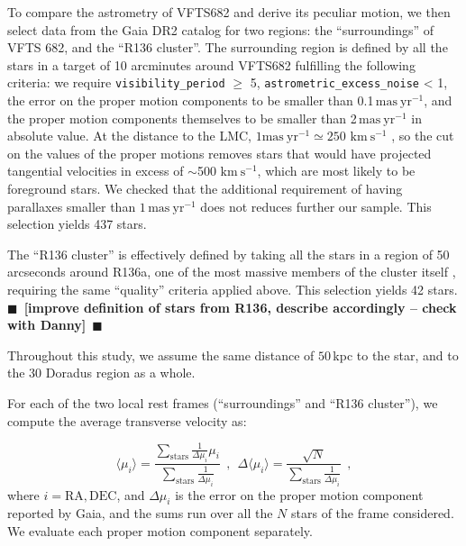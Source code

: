 \documentclass{aa}
\newcommand{\todo}[1]{{\large $\blacksquare$~\textbf{\color{red}[#1]}}~$\blacksquare$}
\newcommand{\kms}{{\,\mathrm{km\ s^{-1}}}}
\begin{document}
To compare the astrometry of VFTS682 and derive its peculiar motion,
we then select data from the Gaia DR2 catalog for two regions: the
``surroundings'' of VFTS 682, and the ``R136 cluster''. The
surrounding region is defined by all the stars in a target of 10 arcminutes around
VFTS682 fulfilling the following criteria: we require \texttt{visibility\_period} $\geq$ 5,
\texttt{astrometric\_excess\_noise} < 1, the error on the proper
motion components to be smaller than 0.1\,$\mathrm{mas\ yr^{-1}}$,
and the proper motion components themselves to be smaller than
2\,$\mathrm{mas\ yr^{-1}}$ in absolute value. At the distance to the
LMC, $1\mathrm{mas\ yr^{-1}}\simeq250\,\kms$ \citep[e.g.,][]{lennon:18}, so the cut on the values
of the proper motions removes stars that would have projected
tangential velocities in excess of $\sim$500\,$\kms$, which are most
likely to be foreground stars. We checked that the additional
requirement of having parallaxes smaller than $1\,\mathrm{mas\
  yr^{-1}}$ does not reduces further our sample. This selection yields 437 stars.

The ``R136 cluster'' is effectively defined by taking all the stars
in a region of 50 arcseconds around R136a, one of the most massive members of
the cluster itself \citep[][]{crowther:10}, requiring the same
``quality'' criteria applied above. This selection yields 42 stars.
\todo{improve definition of stars from R136, describe accordingly -- check with Danny}

Throughout this study, we assume the same distance of $50$\,kpc to the star, and to
the 30 Doradus region as a whole.%

For each of the two local rest frames (``surroundings'' and ``R136
cluster''), we compute the average transverse velocity as:

\begin{equation}
  \label{eq:mean}
  \langle \mu_i\rangle = \frac{\sum_\mathrm{stars}\frac{1}{\Delta
      \mu_i}\mu_i}{\sum_\mathrm{stars} \frac{1}{\Delta \mu_i}} \ \ , \
  \ \Delta \langle \mu_i\rangle = \frac{\sqrt{N}}{\sum_\mathrm{stars}
    \frac{1}{\Delta \mu_i}} \ \ ,
\end{equation}
where $i = \mathrm{RA}, \mathrm{DEC}$, and $\Delta \mu_i$ is the error
on the proper motion component reported by Gaia, and the sums run over
all the $N$ stars of the frame considered. We evaluate each proper motion
component separately. 
\end{document}
